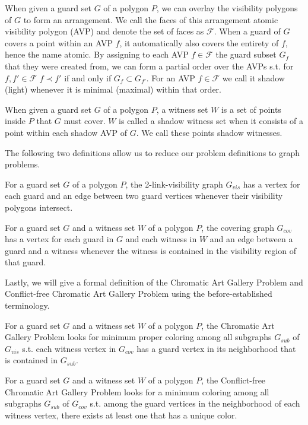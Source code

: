 \begin{definition}
When given a guard set $G$ of a polygon $P$, we can overlay the visibility polygons of $G$ to form an arrangement. We call the faces of this arrangement atomic visibility polygon (AVP) and denote the set of faces as $\mathcal{F}$. When a guard of $G$ covers a point within an AVP $f$, it automatically also covers the entirety of $f$, hence the name atomic. By assigning to each AVP $f\in\mathcal{F}$ the guard subset $G_{f}$ that they were created from, we can form a partial order over the AVPs s.t. for $f,f'\in\mathcal{F}$ $f\prec f'$ if and only if $G_{f}\subset G_{f'}$. For an AVP $f\in\mathcal{F}$ we call it shadow (light) whenever it is minimal (maximal) within that order.
\end{definition}

\begin{definition}
When given a guard set $G$ of a polygon $P$, a witness set $W$ is a set of points inside $P$ that $G$ must cover. $W$ is called a shadow witness set when it consists of a point within each shadow AVP of $G$. We call these points shadow witnesses.
\end{definition}

The following two definitions allow us to reduce our problem definitions to graph problems.

\begin{definition}
For a guard set $G$ of a polygon $P$, the 2-link-visibility graph $G_{vis}$ has a vertex for each guard and an edge between two guard vertices whenever their visibility polygons intersect.
\end{definition}

\begin{definition}
For a guard set $G$ and a witness set $W$ of a polygon $P$, the covering graph $G_{cov}$ has a vertex for each guard in $G$ and each witness in $W$ and an edge between a guard and a witness whenever the witness is contained in the visibility region of that guard.
\end{definition}

Lastly, we will give a formal definition of the Chromatic Art Gallery Problem and Conflict-free Chromatic Art Gallery Problem using the before-established terminology.

\begin{definition}
For a guard set $G$ and a witness set $W$ of a polygon $P$, the Chromatic Art Gallery Problem looks for minimum proper coloring among all subgraphs $G_{sub}$ of $G_{vis}$ s.t. each witness vertex in $G_{cov}$ has a guard vertex in its neighborhood that is contained in $G_{sub}$.
\end{definition}

\begin{definition}
For a guard set $G$ and a witness set $W$ of a polygon $P$, the Conflict-free Chromatic Art Gallery Problem looks for a minimum coloring among all subgraphs $G_{sub}$ of $G_{cov}$ s.t. among the guard vertices in the neighborhood of each witness vertex, there exists at least one that has a unique color.
\end{definition}